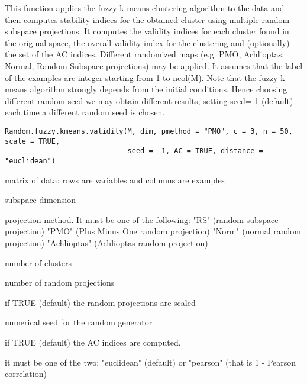 \documentclass{article}
\begin{document}
\begin{Description}\relax
This function applies the fuzzy-k-means clustering algorithm to the data and then computes stability indices for the
obtained cluster using multiple random subspace projections. 
It computes the validity indices for each cluster found in the original space, the overall validity index for the
clustering and (optionally) the set of the AC indices.
Different randomized maps (e.g. PMO, Achlioptas, Normal, Random Subspace projections) may be applied.
It assumes that the label of the examples are integer starting from 1 to ncol(M).
Note that the fuzzy-k-means algorithm strongly depends from the initial conditions. Hence choosing  different random seed
we may obtain different results; setting seed=-1 (default) each time a different random seed is chosen.
\end{Description}
\begin{Usage}
\begin{verbatim}
Random.fuzzy.kmeans.validity(M, dim, pmethod = "PMO", c = 3, n = 50, scale = TRUE, 
                             seed = -1, AC = TRUE, distance = "euclidean")
\end{verbatim}
\end{Usage}
\begin{Arguments}
\begin{ldescription}
\item[\code{M}] matrix of data: rows are variables and columns are examples 
\item[\code{dim}] subspace dimension 
\item[\code{pmethod}] projection method. It must be one of the following: 
"RS" (random subspace projection)
"PMO" (Plus Minus One random projection)
"Norm" (normal random projection)
"Achlioptas" (Achlioptas random projection) 
\item[\code{c}] number of clusters 
\item[\code{n}] number of  random projections 
\item[\code{scale}] if TRUE (default) the random projections are scaled 
\item[\code{seed}] numerical seed for the random generator 
\item[\code{AC}] if TRUE (default) the AC indices are computed. 
\item[\code{distance}] it must be one of the two: "euclidean" (default) or "pearson" (that is 1 - Pearson correlation) 
\end{ldescription}
\end{Arguments}
\end{document}
